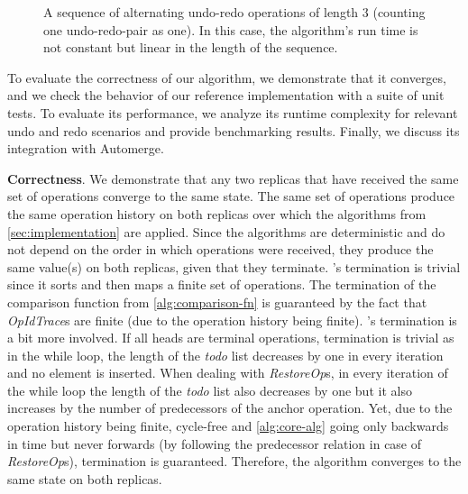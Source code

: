 \documentclass[sigplan,natbib=false,review]{acmart}
\newcommand{\setop}[4][set]{$\mathit{#1_{#2}^{#3}}{(#4)}$}
\newcommand{\undop}[5][undo]{$\mathit{#1_{#2}^{#3}}{(_{#4}^{#5})}$}
\newcommand{\redop}[5][redo]{$\mathit{#1_{#2}^{#3}}{(_{#4}^{#5})}$}
\newcommand{\restopkind}{\textit{RestoreOp}}
\newcommand{\opidtrace}{\textit{OpIdTrace}}
\begin{document}
\begin{figure*}[ht!]
\centering
{}
\caption{
  A sequence of alternating undo-redo operations
  of length $3$ (counting one undo-redo-pair as one).
  In this case, the algorithm's run time is not constant but linear
  in the length of the sequence.
}\label{fig:degenerate-op-sequence}
\end{figure*}

To evaluate the correctness of our algorithm, we demonstrate that it converges,
and we check the behavior of our reference implementation with a suite of unit tests.
To evaluate its performance, we analyze its runtime complexity for relevant
undo and redo scenarios and provide benchmarking results.
Finally, we discuss its integration with Automerge.

\textbf{Correctness}.
We demonstrate that any two replicas that have received the same set of
operations converge to the same state.
The same set of operations produce the same operation history on both
replicas over which the algorithms from \cref{sec:implementation} are applied.
Since the algorithms are deterministic and do not depend on the order in which
operations were received, they produce the same value(s) on both
replicas, given that they terminate.
's termination is trivial since it sorts and then
maps a finite set of operations.
The termination of the comparison function from \cref{alg:comparison-fn} is
guaranteed by the fact that \opidtrace{}s are finite
(due to the operation history being finite).
's termination is a bit more involved.
If all heads are terminal operations, termination is trivial as in the 
while loop, the length of the \textit{todo} list decreases by one in every iteration
and no element is inserted.
When dealing with \restopkind{}s, in every iteration of the while loop
the length of the \textit{todo} list also decreases by one but it also 
increases by the number of predecessors of the anchor operation.
Yet, due to the operation history being finite, cycle-free and \autoref{alg:core-alg}
going only backwards in time but never forwards
(by following the predecessor relation in case of \restopkind{}s),
termination is guaranteed.
Therefore, the algorithm converges to the same state on both replicas.
\end{document}
